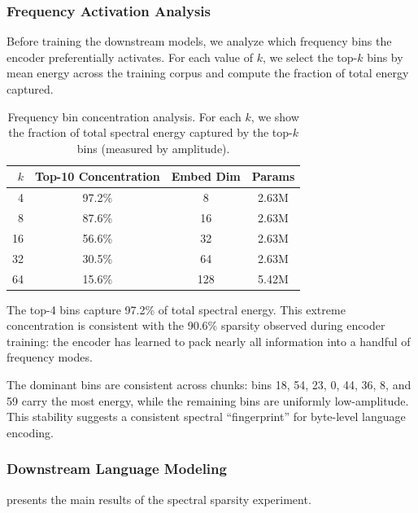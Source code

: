 \documentclass[10pt,twocolumn]{article}
\begin{document}
\subsubsection{Frequency Activation Analysis}

Before training the downstream models, we analyze which frequency bins the encoder preferentially activates. For each value of $k$, we select the top-$k$ bins by mean energy across the training corpus and compute the fraction of total energy captured.

\begin{table}[t]
\centering
\caption{Frequency bin concentration analysis. For each $k$, we show the fraction of total spectral energy captured by the top-$k$ bins (measured by amplitude).}
\label{tab:bin_concentration}
\small
\begin{tabular}{@{}rccc@{}}
\toprule
$k$ & \textbf{Top-10 Concentration} & \textbf{Embed Dim} & \textbf{Params} \\
\midrule
4  & 97.2\% & 8   & 2.63M \\
8  & 87.6\% & 16  & 2.63M \\
16 & 56.6\% & 32  & 2.63M \\
32 & 30.5\% & 64  & 2.63M \\
64 & 15.6\% & 128 & 5.42M \\
\bottomrule
\end{tabular}
\end{table}

The top-4 bins capture 97.2\% of total spectral energy. This extreme concentration is consistent with the 90.6\% sparsity observed during encoder training: the encoder has learned to pack nearly all information into a handful of frequency modes.

The dominant bins are consistent across chunks: bins 18, 54, 23, 0, 44, 36, 8, and 59 carry the most energy, while the remaining bins are uniformly low-amplitude. This stability suggests a consistent spectral ``fingerprint'' for byte-level language encoding.

\subsubsection{Downstream Language Modeling}

 presents the main results of the spectral sparsity experiment.
\end{document}
